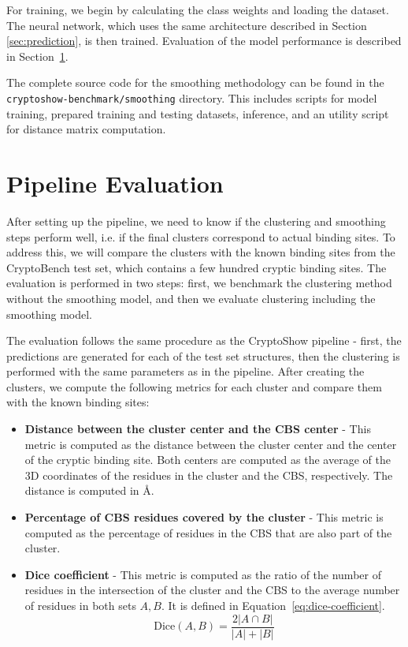For training, we begin by calculating the class weights and loading the dataset. The neural network, which uses the same architecture described in Section \ref{sec:prediction}, is then trained. Evaluation of the model performance is described in Section~\ref{sec:pipeline-evaluation}.

The complete source code for the smoothing methodology can be found in the \lstinline!cryptoshow-benchmark/smoothing! directory. This includes scripts for model training, prepared training and testing datasets, inference, and an utility script for distance matrix computation.

\section{Pipeline Evaluation}
\label{sec:pipeline-evaluation}

After setting up the pipeline, we need to know if the clustering and smoothing steps perform well, i.e. if the final clusters correspond to actual binding sites. To address this, we will compare the clusters with the known binding sites from the CryptoBench test set, which contains a few hundred cryptic binding sites.  The evaluation is performed in two steps: first, we benchmark the clustering method without the smoothing model, and then we evaluate clustering including the smoothing model.

The evaluation follows the same procedure as the CryptoShow pipeline - first, the predictions are generated for each of the test set structures, then the clustering is performed with the same parameters as in the pipeline. After creating the clusters, we compute the following metrics for each cluster and compare them with the known binding sites:

\begin{itemize}
    \item \textbf{Distance between the cluster center and the CBS center} - This metric is computed as the distance between the cluster center and the center of the cryptic binding site. Both centers are computed as the average of the 3D coordinates of the residues in the cluster and the CBS, respectively. The distance is computed in \AA.
    \item \textbf{Percentage of CBS residues covered by the cluster} - This metric is computed as the percentage of residues in the CBS that are also part of the cluster.
    \item \textbf{Dice coefficient} - This metric is computed as the ratio of the number of residues in the intersection of the cluster and the CBS to the average number of residues in both sets $A, B$. It is defined in Equation~\ref{eq:dice-coefficient}.
    \begin{equation}
        \text{Dice}(A, B) = \frac{2 |A \cap B|}{|A| + |B|}
        \label{eq:dice-coefficient}
    \end{equation}
\end{itemize}

